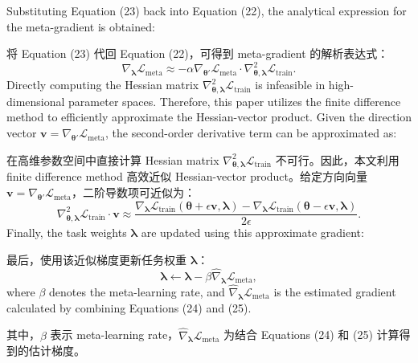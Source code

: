 \documentclass[11pt]{article}
\begin{document}
Substituting Equation (23) back into Equation (22), the analytical expression for the meta-gradient is obtained:

将 Equation (23) 代回 Equation (22)，可得到 meta-gradient 的解析表达式：
\begin{equation}
	{{\nabla }_{\boldsymbol{\lambda }}}{{\mathcal{L}}_{\text{meta}}}\approx -\alpha {{\nabla }_{{\boldsymbol{{\theta }'}}}}{{\mathcal{L}}_{\text{meta}}}\cdot \nabla _{\boldsymbol{\theta },\boldsymbol{\lambda }}^{2}{{\mathcal{L}}_{\text{train}}}.
\end{equation}
Directly computing the Hessian matrix $\nabla_{\boldsymbol{\theta}, \boldsymbol{\lambda}}^2 \mathcal{L}_{\text{train}}$ is infeasible in high-dimensional parameter spaces. Therefore, this paper utilizes the finite difference method to efficiently approximate the Hessian-vector product. Given the direction vector $\mathbf{v} = \nabla_{\boldsymbol{\theta}'} \mathcal{L}_{\text{meta}}$, the second-order derivative term can be approximated as:

在高维参数空间中直接计算 Hessian matrix $\nabla_{\boldsymbol{\theta}, \boldsymbol{\lambda}}^2 \mathcal{L}_{\text{train}}$ 不可行。因此，本文利用 finite difference method 高效近似 Hessian-vector product。给定方向向量 $\mathbf{v} = \nabla_{\boldsymbol{\theta}'} \mathcal{L}_{\text{meta}}$，二阶导数项可近似为：
\begin{equation}
	\nabla _{\boldsymbol{\theta },\boldsymbol{\lambda }}^{2}{{\mathcal{L}}_{\text{train}}}\cdot \mathbf{v}\approx \frac{{{\nabla }_{\boldsymbol{\lambda }}}{{\mathcal{L}}_{\text{train}}}(\boldsymbol{\theta }+\epsilon \mathbf{v},\boldsymbol{\lambda })-{{\nabla }_{\boldsymbol{\lambda }}}{{\mathcal{L}}_{\text{train}}}(\boldsymbol{\theta }-\epsilon \mathbf{v},\boldsymbol{\lambda })}{2\epsilon }.
\end{equation}
Finally, the task weights $\boldsymbol{\lambda}$ are updated using this approximate gradient:

最后，使用该近似梯度更新任务权重 $\boldsymbol{\lambda}$：
\begin{equation}
	\boldsymbol{\lambda }\leftarrow \boldsymbol{\lambda }-\beta {{\hat{\nabla }}_{\boldsymbol{\lambda }}}{{\mathcal{L}}_{\text{meta}}},
\end{equation}
where $\beta$ denotes the meta-learning rate, and $\hat{\nabla}_{\boldsymbol{\lambda}} \mathcal{L}_{\text{meta}}$ is the estimated gradient calculated by combining Equations (24) and (25).

其中，$\beta$ 表示 meta-learning rate，$\hat{\nabla}_{\boldsymbol{\lambda}} \mathcal{L}_{\text{meta}}$ 为结合 Equations (24) 和 (25) 计算得到的估计梯度。
\end{document}
